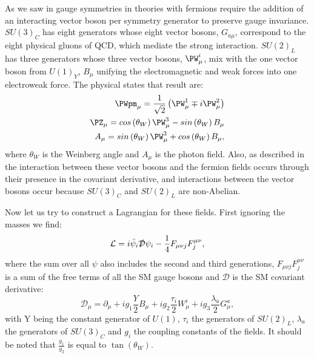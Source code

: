 As we saw in  gauge symmetries in theories with fermions require the addition of an interacting vector boson per symmetry generator to preserve gauge invariance. $SU\left(3\right)_{C}$ has eight generators whose eight vector bosons, $G_{a\mu}$, correspond to the eight physical gluons of \ac{QCD}, which mediate the strong interaction. $SU\left(2\right)_{L}$ has three generators whose three vector bosons, $\PW^{i}_{\mu}$, mix with the one vector boson from $U\left(1\right)_{Y}$, $B_{\mu}$ unifying the electromagnetic and weak forces into one electroweak force. The physical states that result are:
\begin{equation}
  \begin{split}
  \PWpm_{\mu}=\frac{1}{\sqrt{2}}\left(\PW^{1}_{\mu}\mp i\PW^{2}_{\mu}\right) \\
  \PZ_{\mu}=cos\left(\theta_{W}\right)\PW^{3}_{\mu}-sin\left(\theta_{W}\right)B_{\mu} \\
  A_{\mu}=sin\left(\theta_{W}\right)\PW^{3}_{\mu}+cos\left(\theta_{W}\right)B_{\mu},
  \end{split}
\end{equation}
where $\theta_{W}$ is the Weinberg angle and $A_{\mu}$ is the photon field. Also, as described in  the interaction between these vector bosons and the fermion fields occurs through their presence in the covariant derivative, and interactions between the vector bosons occur because $SU\left(3\right)_{C}$ and $SU\left(2\right)_{L}$ are non-Abelian.

Now let us try to construct a Lagrangian for these fields. First ignoring the masses we find:
\begin{equation}
  \mathcal{L}=i\bar{\psi}_{i}\slashed{\mathcal{D}}\psi_{i}-\frac{1}{4}F_{\mu\nu j}F^{\mu\nu}_{j},
\end{equation}
where the sum over all $\psi$ also includes the second and third generations, $F_{\mu\nu j}F^{\mu\nu}_{j}$ is a sum of the free terms of all the SM gauge bosons and $\mathcal{D}$ is the SM covariant derivative:
\begin{equation}
  \mathcal{D_{\mu}}=\partial_{\mu}+ig_{1}\frac{Y}{2}B_{\mu}+ig_{2}\frac{\tau_{i}}{2}W_{\mu}^{i}+ig_{3}\frac{\lambda_{a}}{2}G_{\mu}^{a},
\end{equation}
with Y being the constant generator of $U\left(1\right)$, $\tau_{i}$ the generators of $SU\left(2\right)_{L}$, $\lambda_{a}$ the generators of $SU\left(3\right)_{C}$ and $g_{i}$ the coupling constants of the fields. It should be noted that $\frac{g_{1}}{g_{2}}$ is equal to $\tan\left(\theta_{W}\right)$.

